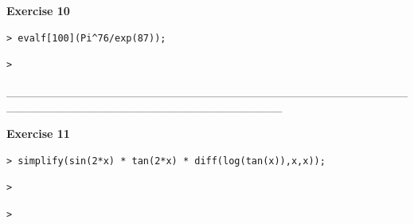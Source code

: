 \documentclass{article}
\begin{document}
\begin{Maple Normal}
\textbf{Exercise 10}
\end{Maple Normal}
\begin{lstlisting}
> evalf[100](Pi^76/exp(87));
\end{lstlisting}
\begin{lstlisting}
> 
\end{lstlisting}
\begin{Maple Normal}
\_\_\_\_\_\_\_\_\_\_\_\_\_\_\_\_\_\_\_\_\_\_\_\_\_\_\_\_\_\_\_\_\_\_\_\_\_\_\_\_\_\_\_\_\_\_\_\_\_\_\_\_\_\_\_\_\_\_\_\_\_\_\_\_\_\_\_\_\_\_\_\_\_\_\_\_\_\_\_\_\_
\end{Maple Normal}
\begin{Maple Normal}
\textbf{Exercise 11}
\end{Maple Normal}
\begin{lstlisting}
> simplify(sin(2*x) * tan(2*x) * diff(log(tan(x)),x,x));
\end{lstlisting}
\begin{lstlisting}
> 
\end{lstlisting}
\begin{lstlisting}
> 
\end{lstlisting}
\end{document}
